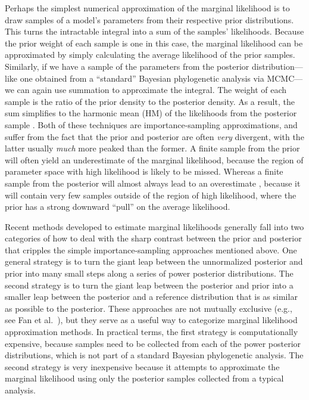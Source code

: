 Perhaps the simplest numerical approximation of the marginal likelihood is to
draw samples of a model's parameters from their respective prior distributions.
This turns the intractable integral into a sum of the samples' likelihoods.
Because the prior weight of each sample is one in this case, the marginal
likelihood can be approximated by simply calculating the average likelihood of
the prior samples.
Similarly, if we have a sample of the parameters from the posterior
distribution---like one obtained from a ``standard'' Bayesian phylogenetic
analysis via MCMC---we can again use summation to approximate the integral.
The weight of each sample is the ratio of the prior density to the posterior
density.
As a result, the sum simplifies to the harmonic mean (HM) of the likelihoods
from the posterior sample \citep{Newton1994}.
Both of these techniques are importance-sampling approximations, and suffer
from the fact that the prior and posterior are often \emph{very} divergent,
with the latter usually \emph{much} more peaked than the former.
A finite sample from the prior will often yield an underestimate of the
marginal likelihood, because the region of parameter space with high likelihood
is likely to be missed.
Whereas a finite sample from the posterior will almost always lead to an
overestimate \citep{Lartillot2006,Xie2011,Fan2011}, because it will contain
very few samples outside of the region of high likelihood, where the prior has
a strong downward ``pull'' on the average likelihood.

Recent methods developed to estimate marginal likelihoods generally fall into
two categories of how to deal with the sharp contrast between the prior
and posterior that cripples the simple importance-sampling approaches
mentioned above.
One general strategy is to turn the giant leap between the unnormalized
posterior and prior into many small steps along a series of power posterior
distributions.
The second strategy is to turn the giant leap between the posterior and prior
into a smaller leap between the posterior and a reference distribution that is
as similar as possible to the posterior.
These approaches are not mutually exclusive (e.g., see Fan et al.\
\citeyear{Fan2011}), but they serve as a useful way to categorize marginal
likelihood approximation methods.
In practical terms, the first strategy is computationally expensive, because
samples need to be collected from each of the power posterior distributions,
which is not part of a standard Bayesian phylogenetic analysis.
The second strategy is very inexpensive because it attempts to approximate the
marginal likelihood using only the posterior samples collected from a
typical analysis.

